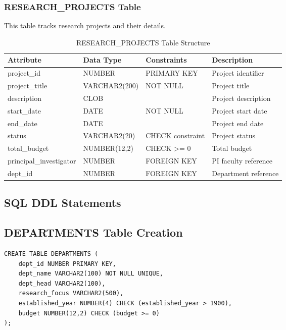 \documentclass[12pt,a4paper]{article}
\begin{document}
\subsubsection{RESEARCH\_PROJECTS Table}
This table tracks research projects and their details.

\begin{table}[H]
\centering
\begin{tabular}{|l|l|l|l|}
\hline
\textbf{Attribute} & \textbf{Data Type} & \textbf{Constraints} & \textbf{Description} \\
\hline
project\_id & NUMBER & PRIMARY KEY & Project identifier \\
project\_title & VARCHAR2(200) & NOT NULL & Project title \\
description & CLOB & & Project description \\
start\_date & DATE & NOT NULL & Project start date \\
end\_date & DATE & & Project end date \\
status & VARCHAR2(20) & CHECK constraint & Project status \\
total\_budget & NUMBER(12,2) & CHECK >= 0 & Total budget \\
principal\_investigator & NUMBER & FOREIGN KEY & PI faculty reference \\
dept\_id & NUMBER & FOREIGN KEY & Department reference \\
\hline
\end{tabular}
\caption{RESEARCH\_PROJECTS Table Structure}
\end{table}

\subsection{SQL DDL Statements}

\subsection{DEPARTMENTS Table Creation}
\begin{lstlisting}[style=sqlstyle]
CREATE TABLE DEPARTMENTS (
    dept_id NUMBER PRIMARY KEY,
    dept_name VARCHAR2(100) NOT NULL UNIQUE,
    dept_head VARCHAR2(100),
    research_focus VARCHAR2(500),
    established_year NUMBER(4) CHECK (established_year > 1900),
    budget NUMBER(12,2) CHECK (budget >= 0)
);
\end{lstlisting}
\end{document}
